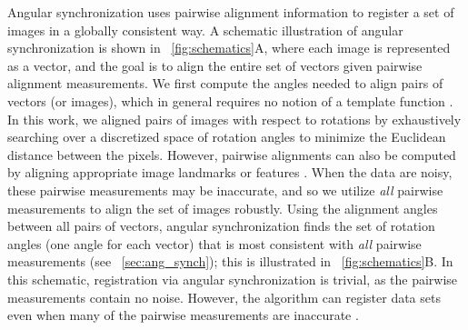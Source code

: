 Angular synchronization uses pairwise alignment information to register a set of images in a globally consistent way.
%
A schematic illustration of angular synchronization is shown in \fig~\ref{fig:schematics}A, where each image is represented as a vector, and the goal is to align the entire set of vectors given pairwise alignment measurements.
%
We first compute the angles needed to align pairs of vectors (or images), which in general requires no notion of a template function \citep{ahuja2007template, sonday2013noisy}.
%
In this work, we aligned pairs of images with respect to rotations by exhaustively searching over a discretized space of rotation angles to minimize the Euclidean distance between the pixels.
%
However, pairwise alignments can also be computed by aligning appropriate image landmarks or features \citep{ian1998statistical}.
%
When the data are noisy, these pairwise measurements may be inaccurate, and so we utilize {\em all} pairwise measurements to align the set of images robustly.
%
Using the alignment angles between all pairs of vectors, angular synchronization finds the set of rotation angles (one angle for each vector) that is most consistent with {\it all} pairwise measurements (see \sec~\ref{sec:ang_synch}); this is illustrated in \fig~\ref{fig:schematics}B.
%
In this schematic, registration via angular synchronization is trivial, as the pairwise measurements contain no noise.
%
However, the algorithm can register data sets even when many of the pairwise measurements are inaccurate \citep{singer2011angular}.

